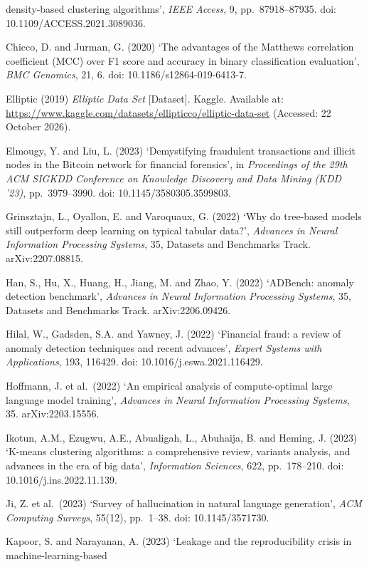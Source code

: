 \begin{references}
  density-based clustering algorithms', \emph{IEEE Access}, 9, pp.\ 87918--87935.
  doi: 10.1109/ACCESS.2021.3089036.
\item Chicco, D. and Jurman, G. (2020) `The advantages of the Matthews correlation coefficient (MCC) over F1 score
  and accuracy in binary classification evaluation', \emph{BMC Genomics}, 21, 6. doi: 10.1186/s12864-019-6413-7.
\item Elliptic (2019) \emph{Elliptic Data Set} [Dataset]. Kaggle. Available at:
  \url{https://www.kaggle.com/datasets/ellipticco/elliptic-data-set} (Accessed: 22 October 2026).
\item Elmougy, Y. and Liu, L. (2023) `Demystifying fraudulent transactions and illicit nodes in the Bitcoin
  network for financial forensics', in \emph{Proceedings of the 29th ACM SIGKDD Conference on Knowledge Discovery
  and Data Mining (KDD '23)}, pp.\ 3979--3990. doi: 10.1145/3580305.3599803.
\item Grinsztajn, L., Oyallon, E. and Varoquaux, G. (2022) `Why do tree-based models still outperform deep
  learning on typical tabular data?', \emph{Advances in Neural Information Processing Systems}, 35, Datasets and
  Benchmarks Track. arXiv:2207.08815.
\item Han, S., Hu, X., Huang, H., Jiang, M. and Zhao, Y. (2022) `ADBench: anomaly detection benchmark',
  \emph{Advances in Neural Information Processing Systems}, 35, Datasets and Benchmarks Track. arXiv:2206.09426.
\item Hilal, W., Gadsden, S.A. and Yawney, J. (2022) `Financial fraud: a review of anomaly detection techniques
  and recent advances', \emph{Expert Systems with Applications}, 193, 116429. doi: 10.1016/j.eswa.2021.116429.
\item Hoffmann, J. et al.\ (2022) `An empirical analysis of compute-optimal large language model training',
  \emph{Advances in Neural Information Processing Systems}, 35. arXiv:2203.15556.
\item Ikotun, A.M., Ezugwu, A.E., Abualigah, L., Abuhaija, B. and Heming, J. (2023) `K-means clustering
  algorithms: a comprehensive review, variants analysis, and advances in the era of big data',
  \emph{Information Sciences}, 622, pp.\ 178--210. doi: 10.1016/j.ins.2022.11.139.
\item Ji, Z. et al.\ (2023) `Survey of hallucination in natural language generation', \emph{ACM Computing
  Surveys}, 55(12), pp.\ 1--38. doi: 10.1145/3571730.
\item Kapoor, S. and Narayanan, A. (2023) `Leakage and the reproducibility crisis in machine-learning-based

\end{references}

